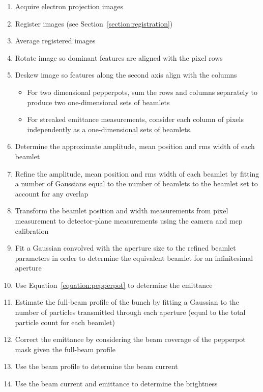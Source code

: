 \begin{enumerate}
    \item Acquire electron projection images
    \item Register images (see Section~\ref{section:registration})
    \item Average registered images
    \item Rotate image so dominant features are aligned with the pixel rows
    \item Deskew image so features along the second axis align with the columns
    \begin{itemize}
        \item For two dimensional pepperpots, sum the rows and columns separately to produce two one-dimensional sets of beamlets
        \item For streaked emittance measurements, consider each column of pixels independently as a one-dimensional sets of beamlets.
    \end{itemize}
    \item Determine the approximate amplitude, mean position and \gls{rms} width of each beamlet
    \item Refine the amplitude, mean position and \gls{rms} width of each beamlet by fitting a number of Gaussians equal to the number of beamlets to the beamlet set to account for any overlap
    \item Transform the beamlet position and width measurements from pixel measurement to detector-plane measurements using the camera and \gls{mcp} calibration
    \item Fit a Gaussian convolved with the aperture size to the refined beamlet parameters in order to determine the equivalent beamlet for an infinitesimal aperture
    \item Use Equation~\ref{equation:pepperpot} to determine the emittance
    \item Estimate the full-beam profile of the bunch by fitting a Gaussian to the number of particles transmitted through each aperture (equal to the total particle count for each beamlet)
    \item Correct the emittance by considering the beam coverage of the pepperpot mask given the full-beam profile
    \item Use the beam profile to determine the beam current
    \item Use the beam current and emittance to determine the brightness
\end{enumerate}


